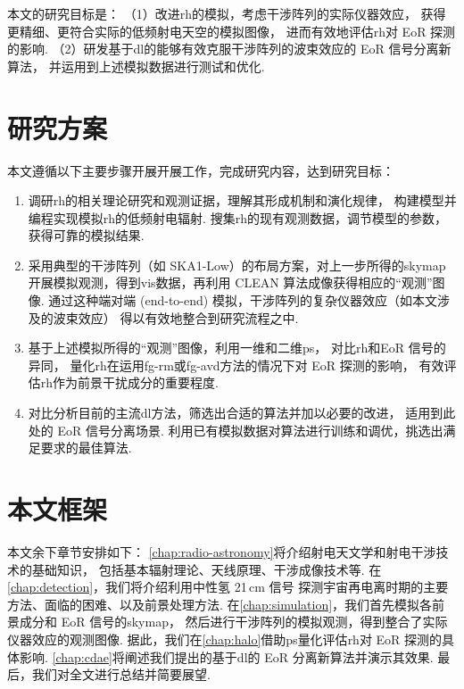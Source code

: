 本文的研究目标是：
（1）改进\ac{rh}的模拟，考虑干涉阵列的实际仪器效应，
获得更精细、更符合实际的低频射电天空的模拟图像，
进而有效地评估\ac{rh}对 EoR 探测的影响.
（2）研发基于\ac{dl}的能够有效克服干涉阵列的波束效应的 EoR 信号分离新算法，
并运用到上述模拟数据进行测试和优化.


\section{研究方案}

本文遵循以下主要步骤开展开展工作，完成研究内容，达到研究目标：
\begin{enumerate}
\item
调研\ac{rh}的相关理论研究和观测证据，理解其形成机制和演化规律，
构建模型并编程实现模拟\ac{rh}的低频射电辐射.
搜集\ac{rh}的现有观测数据，调节模型的参数，获得可靠的模拟结果.

\item
采用典型的干涉阵列（如 SKA1-Low）的布局方案，对上一步所得的\ac{skymap}
开展模拟观测，得到\ac{vis}数据，再利用 CLEAN 算法成像获得相应的\enquote{观测}图像.
通过这种端对端 (end-to-end) 模拟，干涉阵列的复杂仪器效应（如本文涉及的波束效应）
得以有效地整合到研究流程之中.

\item
基于上述模拟所得的\enquote{观测}图像，利用一维和二维\ac{ps}，
对比\ac{rh}和EoR 信号的异同，
量化\ac{rh}在运用\ac{fg-rm}或\ac{fg-avd}方法的情况下对 EoR 探测的影响，
有效评估\ac{rh}作为前景干扰成分的重要程度.

\item
对比分析目前的主流\ac{dl}方法，筛选出合适的算法并加以必要的改进，
适用到此处的 EoR 信号分离场景.
利用已有模拟数据对算法进行训练和调优，挑选出满足要求的最佳算法.

\end{enumerate}


\section{本文框架}

本文余下章节安排如下：
\autoref{chap:radio-astronomy}将介绍射电天文学和射电干涉技术的基础知识，
包括基本辐射理论、天线原理、干涉成像技术等.
在\autoref{chap:detection}，我们将介绍利用中性氢 21\,cm 信号
探测宇宙再电离时期的主要方法、面临的困难、以及前景处理方法.
在\autoref{chap:simulation}，我们首先模拟各前景成分和 EoR 信号的\ac{skymap}，
然后进行干涉阵列的模拟观测，得到整合了实际仪器效应的观测图像.
据此，我们在\autoref{chap:halo}借助\ac{ps}量化评估\ac{rh}对
EoR 探测的具体影响.
\autoref{chap:cdae}将阐述我们提出的基于\ac{dl}的 EoR 分离新算法并演示其效果.
最后，我们对全文进行总结并简要展望.

